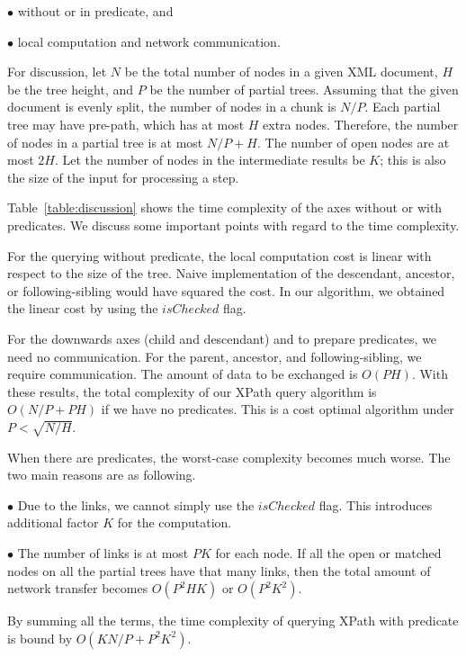 $\bullet$ without or in predicate, and

$\bullet$ local computation and network communication.


For discussion, let $N$ be the total number of nodes in a given XML
document, $H$ be the tree height, and $P$ be the number of partial trees.
Assuming that the given document is evenly split,
the number of nodes in a chunk is $N/P$.
Each partial tree may have pre-path, which has at most $H$ extra nodes.
Therefore, the number of nodes in a partial tree is at most $N/P + H$.
The number of open nodes are at most $2H$.
Let the number of nodes in the intermediate results be $K$; this is also the size of the input for processing a step.

Table~\ref{table:discussion} shows the time complexity of the axes without or with predicates.
We discuss some important points with regard to the time complexity.

For the querying without predicate, the local computation cost is linear with respect to the size of the tree.
Naive implementation of the descendant, ancestor, or following-sibling would have squared the cost.
In our algorithm, we obtained the linear cost by using the $\mathit{isChecked}$ flag.

For the downwards axes (child and descendant) and to prepare predicates, we need no communication.
For the parent, ancestor, and following-sibling, we require communication.
The amount of data to be exchanged is $O(PH)$.
With these results, the total complexity of our XPath query algorithm is
$O(N/P + PH)$ if we have no predicates.
This is a cost optimal algorithm under $P < \sqrt{N/H}$.

When there are predicates, the worst-case complexity becomes much worse.
The two main reasons are as following.

$\bullet$  Due to the links, we cannot simply use the $\mathit{isChecked}$ flag.
      This introduces additional factor $K$ for the computation.

$\bullet$ The number of links is at most $PK$ for each node.
      If all the open or matched nodes on all the partial trees have that many links, then
      the total amount of network transfer becomes $O(P^2HK)$ or $O(P^2K^2)$.

By summing all the terms, the time complexity of querying XPath with predicate
is bound by $O(KN/P + P^2K^2)$.

